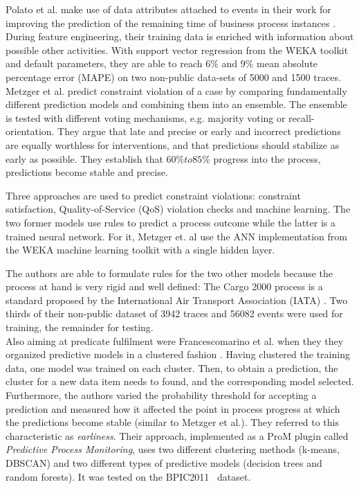 Polato et al. make use of data attributes attached to events in their work for improving the prediction of the remaining time of business process instances \cite{polato2014}. During feature engineering, their training data is enriched with information about possible other activities. With support vector regression from the WEKA toolkit~\cite{web:weka} and default parameters, they are able to reach $6\%$ and $9\%$ mean absolute percentage error (MAPE) on two non-public data-sets of 5000 and 1500 traces.\\

Metzger et al. predict constraint violation of a case by comparing fundamentally different prediction models and combining them into an ensemble. The ensemble is tested with different voting mechanisms, e.g. majority voting or recall-orientation. They argue that late and precise or early and incorrect predictions are equally worthless for interventions, and that predictions should stabilize as early as possible. They establish that $60\% to 85\%$ progress into the process, predictions become stable and precise.

Three approaches are used to predict constraint violations: constraint satisfaction, Quality-of-Service (QoS) violation checks and machine learning. The two former models use rules to predict a process outcome while the latter is a trained neural network. For it, Metzger et. al use the ANN implementation from the WEKA machine learning toolkit with a single hidden layer. 

The authors are able to formulate rules for the two other models because the process at hand is very rigid and well defined: The Cargo 2000 process is a standard proposed by the International Air Transport Association (IATA) \cite{metzger2015}. Two thirds of their non-public dataset of 3942 traces and 56082 events were used for training, the remainder for testing.\\

Also aiming at predicate fulfilment were Francescomarino et al. when they they organized predictive models in a clustered fashion \cite{francescomarino2015}. Having clustered the training data, one model was trained on each cluster. Then, to obtain a prediction, the cluster for a new data item needs to found, and the corresponding model selected. Furthermore, the authors varied the probability threshold for accepting a prediction and measured how it affected the point in process progress at which the predictions become stable (similar to Metzger et al.). They referred to this characteristic as \textit{earliness}. Their approach, implemented as a ProM plugin called \textit{Predictive Process Monitoring}, uses two different clustering methods (k-means, DBSCAN) and two different types of predictive models (decision trees and random forests). It was tested on the BPIC2011~\cite{BPIC2011} dataset.

